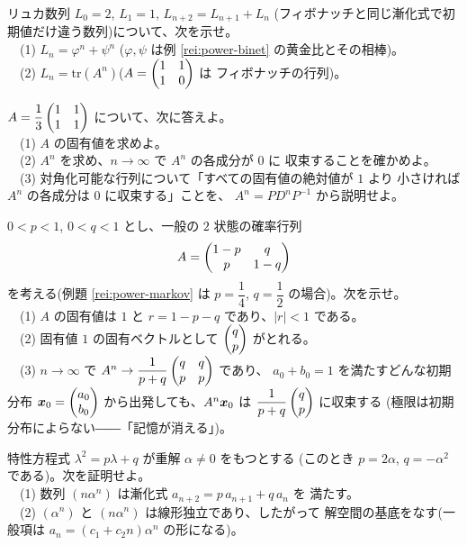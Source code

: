 \begin{mondai}[発展]\label{q:power-ex9}
リュカ数列 $L_0 = 2$, $L_1 = 1$, $L_{n+2} = L_{n+1} + L_n$
(フィボナッチと同じ漸化式で初期値だけ違う数列)について、次を示せ。\\
　(1) $L_n = \varphi^n + \psi^n$
($\varphi, \psi$ は例 \ref{rei:power-binet} の黄金比とその相棒)。\\
　(2) $L_n = \mathrm{tr}(A^n)$($A = \begin{pmatrix}1 & 1 \\ 1 & 0\end{pmatrix}$ は
フィボナッチの行列)。
\end{mondai}

\begin{mondai}[発展]\label{q:power-ex10}
$A = \dfrac{1}{3}\begin{pmatrix}1 & 1 \\ 1 & 1\end{pmatrix}$ について、次に答えよ。\\
　(1) $A$ の固有値を求めよ。\\
　(2) $A^n$ を求め、$n \to \infty$ で $A^n$ の各成分が $0$ に
収束することを確かめよ。\\
　(3) 対角化可能な行列について「すべての固有値の絶対値が $1$ より
小さければ $A^n$ の各成分は $0$ に収束する」ことを、
$A^n = PD^nP^{-1}$ から説明せよ。
\end{mondai}

\begin{mondai}[発展]\label{q:power-ex14}
$0 < p < 1$, $0 < q < 1$ とし、一般の $2$ 状態の確率行列
\[
A = \begin{pmatrix}1 - p & q \\ p & 1 - q\end{pmatrix}
\]
を考える(例題 \ref{rei:power-markov} は $p = \dfrac{1}{4}$,
$q = \dfrac{1}{2}$ の場合)。次を示せ。\\
　(1) $A$ の固有値は $1$ と $r = 1 - p - q$ であり、$|r| < 1$ である。\\
　(2) 固有値 $1$ の固有ベクトルとして $\begin{pmatrix}q \\ p\end{pmatrix}$ がとれる。\\
　(3) $n \to \infty$ で
$A^n \to \dfrac{1}{p + q}\begin{pmatrix}q & q \\ p & p\end{pmatrix}$ であり、
$a_0 + b_0 = 1$ を満たすどんな初期分布 $\bm{x}_0 = \begin{pmatrix}a_0 \\ b_0\end{pmatrix}$
から出発しても、$A^n\bm{x}_0$ は
$\dfrac{1}{p + q}\begin{pmatrix}q \\ p\end{pmatrix}$ に収束する
(極限は初期分布によらない――「記憶が消える」)。
\end{mondai}

\begin{mondai}[証明]\label{q:power-ex11}
特性方程式 $\lambda^2 = p\lambda + q$ が重解 $\alpha \neq 0$ をもつとする
(このとき $p = 2\alpha$, $q = -\alpha^2$ である)。次を証明せよ。\\
　(1) 数列 $(n\alpha^n)$ は漸化式 $a_{n+2} = p\,a_{n+1} + q\,a_n$ を
満たす。\\
　(2) $(\alpha^n)$ と $(n\alpha^n)$ は線形独立であり、したがって
解空間の基底をなす(一般項は $a_n = (c_1 + c_2 n)\alpha^n$ の形になる)。
\end{mondai}

